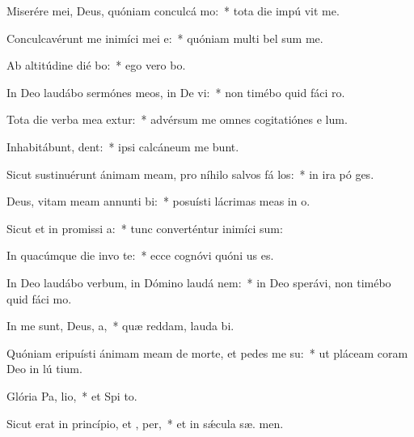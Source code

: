 \item Miserére mei, Deus, quóniam conculcá  mo:~* tota die impú vit me.
\item Conculcavérunt me inimíci mei  e:~* quóniam multi bel sum me.
\item Ab altitúdine dié bo:~* ego vero   bo.
\item In Deo laudábo sermónes meos, in De vi:~* non timébo quid fáci  ro.
\item Tota die verba mea extur:~* advérsum me omnes cogitatiónes e  lum.
\item Inhabitábunt,  dent:~* ipsi calcáneum me bunt.
\item Sicut sustinuérunt ánimam meam, pro níhilo salvos fá los:~* in ira pó ges.
\item Deus, vitam meam annunti bi:~* posuísti lácrimas meas in  o.
\item Sicut et in promissi a:~* tunc converténtur inimíci  sum:
\item In quacúmque die invo te:~* ecce cognóvi quóni  us es.
\item In Deo laudábo verbum, in Dómino laudá nem:~* in Deo sperávi, non timébo quid fáci  mo.
\item In me sunt, Deus,  a,~* quæ reddam, lauda bi.
\item Quóniam eripuísti ánimam meam de morte, et pedes me  su:~* ut pláceam coram Deo in lú tium.
\item Glória Pa,  lio,~* et Spi to.
\item Sicut erat in princípio, et ,  per,~* et in sǽcula sæ. men.
